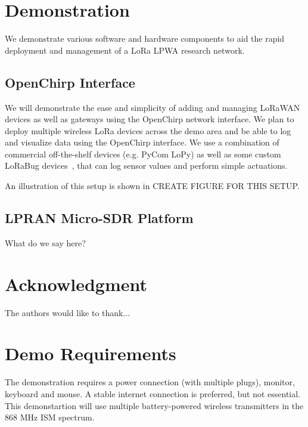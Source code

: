 \documentclass[conference]{IEEEtran}
\begin{document}
\section{Demonstration}
\label{sec:demo}

We demonstrate various software and hardware components to aid the rapid
deployment and management of a LoRa LPWA research network.

\subsection{OpenChirp Interface}
\label{sec:oc-interface-demo}

We will demonstrate the ease and simplicity of adding and managing LoRaWAN
devices as well as gateways using the OpenChirp network interface. We plan to
deploy multiple wireless LoRa devices across the demo area and be able to log
and visualize data using the OpenChirp interface. We use a combination of
commercial off-the-shelf devices (e.g. PyCom LoPy) as well as some custom
LoRaBug devices~\cite{dongare2017openchirp}, that can log sensor values and
perform simple actuations.

An illustration of this setup is shown in {\color{red} CREATE FIGURE FOR THIS
SETUP}.

\subsection{LPRAN Micro-SDR Platform}
\label{sec:lpran-demo}

What do we say here?




\section*{Acknowledgment}


The authors would like to thank...


\balance


\section{Demo Requirements}
\label{sec:requirements}

The demonstration requires a power connection (with multiple plugs), monitor,
keyboard and mouse. A stable internet connection is preferred, but not
essential. This demonstartion will use multiple battery-powered wireless
transmitters in the 868 MHz ISM spectrum.
\end{document}
